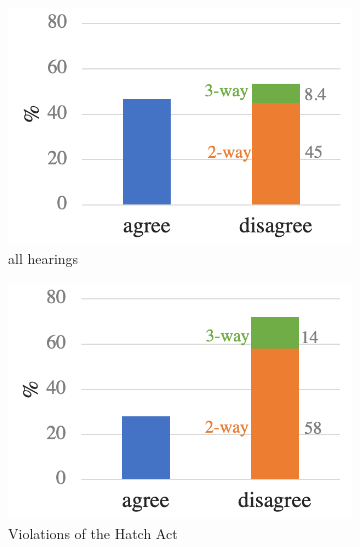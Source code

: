 \begin{figure}
 \centering
 \vspace{-1.2em}
  \begin{subfigure}{.3\textwidth}
  \centering
  \includegraphics[scale=0.28]{plots/subj_disagreement.pdf}
  \vspace{-.3em}
  \caption{all hearings}
\end{subfigure}%
  \begin{subfigure}{.3\textwidth}
  \centering
  \includegraphics[scale=0.3]{plots/subj_disagreement_kerner.pdf}
  \vspace{-.3em}
  \caption{Violations of the Hatch Act}
\end{subfigure}%
\begin{subfigure}{.3\textwidth}
  \centering

\end{subfigure}
\end{figure}
